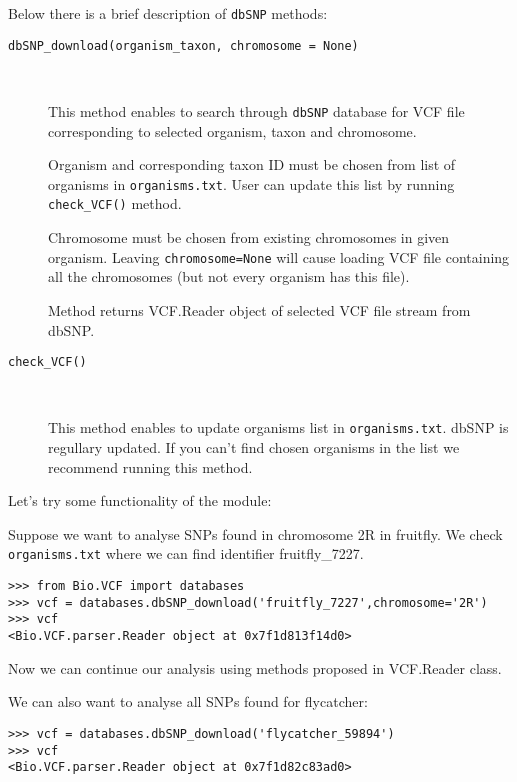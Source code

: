 \noindent Below there is a brief description of \verb|dbSNP| methods:

\begin{description}
  \item[\texttt{dbSNP\_download(organism\_taxon, chromosome = None)}] \

    This method enables to search through \verb|dbSNP| database for VCF file corresponding to selected
    organism, taxon and chromosome.
    
    Organism and corresponding taxon ID must be chosen from list of organisms in \verb|organisms.txt|. User can update this list by running
    \verb|check_VCF()| method.
    
    Chromosome must be chosen from existing chromosomes in given organism. Leaving \verb|chromosome=None| will cause loading VCF file
    containing all the chromosomes (but not every organism has this file).
    
    Method returns VCF.Reader object of selected VCF file stream from dbSNP.
    
    \item[\texttt{check\_VCF()}] \
    
    This method enables to update organisms list in \verb|organisms.txt|. dbSNP is regullary updated. If you can't find chosen organisms in 
    the list we recommend running this method. 

\end{description}

\noindent Let's try some functionality of the module:

\noindent Suppose we want to analyse SNPs found in chromosome 2R in fruitfly. We check \verb|organisms.txt| where we can find identifier 
fruitfly\_7227.

\begin{verbatim}
>>> from Bio.VCF import databases
>>> vcf = databases.dbSNP_download('fruitfly_7227',chromosome='2R')
>>> vcf
<Bio.VCF.parser.Reader object at 0x7f1d813f14d0>
\end{verbatim}

\noindent Now we can continue our analysis using methods proposed in VCF.Reader class.

\noindent We can also want to analyse all SNPs found for flycatcher:

\begin{verbatim}
>>> vcf = databases.dbSNP_download('flycatcher_59894')
>>> vcf
<Bio.VCF.parser.Reader object at 0x7f1d82c83ad0>
\end{verbatim}

